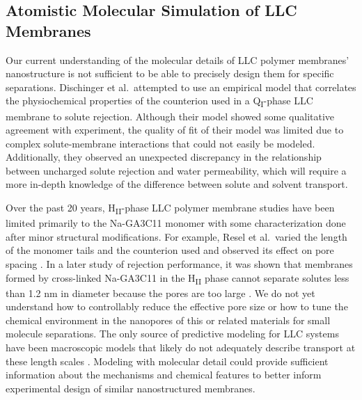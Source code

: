   \subsection{Atomistic Molecular Simulation of LLC Membranes}  
  
  Our current understanding of the molecular details of LLC polymer membranes'
  nanostructure is not sufficient to be able to precisely design them for
  specific separations. Dischinger et al.~attempted to use an empirical model
  that correlates the physiochemical properties of the counterion used in a
  Q\textsubscript{I}-phase LLC membrane to solute rejection\cite{dischinger_effect_2017}.
  Although their model showed some qualitative agreement with experiment, the
  quality of fit of their model was limited due to complex solute-membrane
  interactions that could not easily be modeled. Additionally, they observed
  an unexpected discrepancy in the relationship between uncharged solute
  rejection and water permeability, which will require a more in-depth knowledge of
  the difference between solute and solvent transport.

  Over the past 20 years, H\textsubscript{II}-phase LLC polymer membrane
  studies have been limited primarily to the Na-GA3C11 monomer with some
  characterization done after minor structural modifications. For example, Resel
  et al.~varied the length of the monomer tails and the counterion used and
  observed its effect on pore spacing \cite{resel_structural_2000}. In a later
  study of rejection performance, it was shown that membranes formed by
  cross-linked Na-GA3C11 in the H\textsubscript{II} phase cannot separate solutes
  less than 1.2 nm in diameter because the pores are too large
  \cite{zhou_supported_2005}. We do not yet understand how to controllably reduce
  the effective pore size or how to tune the chemical environment in the
  nanopores of this or related materials for small molecule separations. The only
  source of predictive modeling for LLC systems have been macroscopic models that
  likely do not adequately describe transport at these length scales
  \cite{hatakeyama_water_2011}. Modeling with molecular detail could provide
  sufficient information about the mechanisms and chemical features to better
  inform experimental design of similar nanostructured membranes.
  
